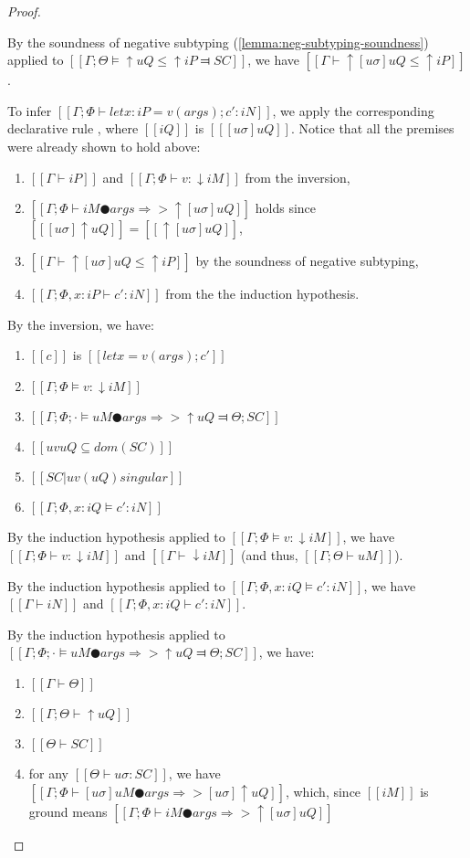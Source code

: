 \begin{proof}
\begin{caseof}
        By the soundness of negative subtyping (\cref{lemma:neg-subtyping-soundness})
        applied to $[[Γ; Θ ⊨ ↑uQ ≤ ↑iP ⫤ SC]]$, we have $[[Γ ⊢ ↑[uσ]uQ ≤ ↑iP]]$.

        To infer $[[Γ ; Φ ⊢ let x : iP = v(args); c' : iN ]]$,
        we apply the corresponding declarative rule , where
        $[[iQ]]$ is $[[ [uσ]uQ  ]]$. Notice that all the premises were already shown to
        hold above:
        \begin{enumerate}
            \item $[[Γ ⊢ iP]]$ and $[[Γ; Φ ⊢ v : ↓iM]]$ from the inversion,
            \item $[[Γ; Φ ⊢ iM ● args ⇒> ↑[uσ]uQ]]$ holds since $[[ [uσ]↑uQ ]] = [[ ↑[uσ]uQ ]]$,
            \item $[[Γ ⊢ ↑[uσ]uQ ≤ ↑iP]]$ by the soundness of negative subtyping,
            \item $[[Γ; Φ, x:iP ⊢ c' : iN]]$ from the the induction hypothesis.
        \end{enumerate}

        \item {}
        By the inversion, we have:
        \begin{enumerate}
            \item $[[c]]$ is $[[let x = v(args) ; c']]$
            \item $[[Γ; Φ ⊨ v : ↓iM]]$ 
            \item $[[Γ ; Φ ; · ⊨ uM ● args ⇒> ↑uQ ⫤ Θ; SC]]$
            \item $[[uv uQ ⊆ dom(SC)]]$
            \item $[[SC|uv(uQ) singular]]$
            \item $[[Γ; Φ, x:iQ ⊨ c' : iN]]$
        \end{enumerate}

        By the induction hypothesis applied to $[[Γ; Φ ⊨ v : ↓iM]]$, we have    
        $[[Γ; Φ ⊢ v : ↓iM]]$ and $[[Γ ⊢ ↓iM]]$ (and thus, $[[Γ ; Θ  ⊢ uM]]$).
       
        By the induction hypothesis applied to $[[Γ; Φ, x:iQ ⊨ c' : iN]]$, we have
        $[[Γ ⊢ iN]]$ and $[[Γ; Φ, x:iQ ⊢ c' : iN]]$.

        By the induction hypothesis applied to 
        $[[Γ ; Φ ; · ⊨ uM ● args ⇒> ↑uQ ⫤ Θ; SC]]$, we have:
        \begin{enumerate}
            \item $[[Γ ⊢ Θ]]$
            \item $[[Γ; Θ ⊢ ↑uQ]]$
            \item $[[Θ ⊢ SC]]$
            \item for any $[[Θ ⊢ uσ : SC]]$, we have $[[ Γ ; Φ ⊢ [uσ]uM ● args ⇒> [uσ]↑uQ ]]$, 
                which, since  $[[iM]]$ is ground means $[[ Γ ; Φ ⊢ iM ● args ⇒> ↑[uσ]uQ]]$
        \end{enumerate}


\end{caseof}
\end{proof}
